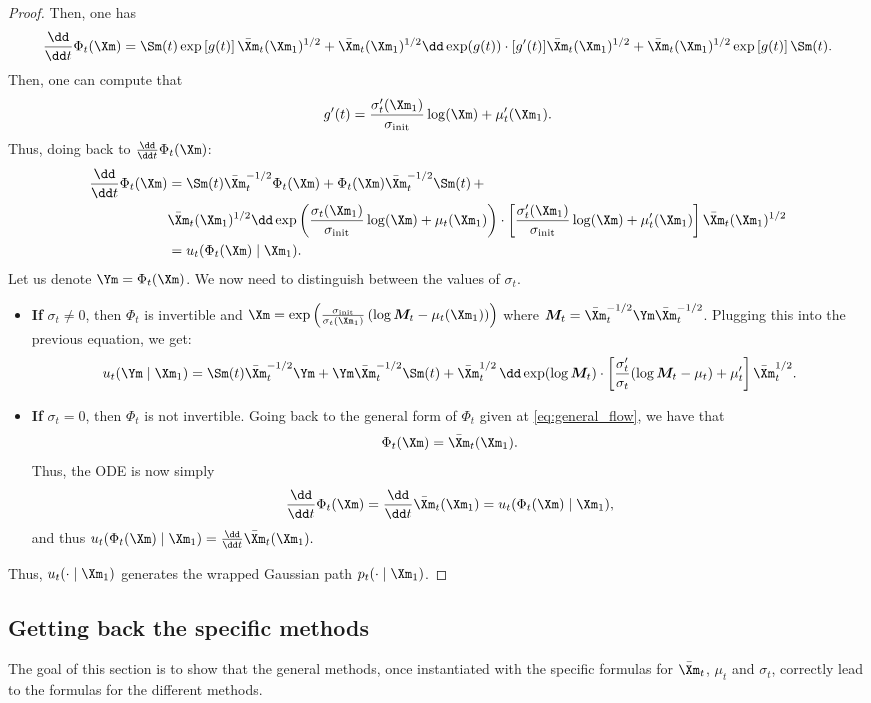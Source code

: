 \documentclass[10pt]{article} %
\theoremstyle{plain}
\theoremstyle{definition}
\theoremstyle{remark}
\begin{document}
\begin{proof}
  Then, one has
  \begin{equation*}
    \frac{\dd}{\dd t} \Phi_t(\Xm) = \Sm(t)\exp\left[g(t)\right]\bar{\Xm}_t(\Xm_1)^{1/2} + \bar{\Xm}_t(\Xm_1)^{1/2}\dd \exp(g(t))\cdot[g'(t)]\bar{\Xm}_t(\Xm_1)^{1/2} +  \bar{\Xm}_t(\Xm_1)^{1/2}\exp\left[g(t)\right]\Sm(t).
  \end{equation*}
  Then, one can compute that
  $$g'(t) = \frac{\sigma'_t(\Xm_1)}{\sigma_{\text{init}}}\log(\Xm) + \mu'_t(\Xm_1).$$
  Thus, doing back to $\frac{\dd}{\dd t} \Phi_t(\Xm)$:
  \begin{align*}
    \frac{\dd}{\dd t} \Phi_t(\Xm) &= \Sm(t)\bar{\Xm}_t^{-1/2} \Phi_t(\Xm) + \Phi_t(\Xm)\bar{\Xm}_t^{-1/2}\Sm(t) \,+\\
    & \bar{\Xm}_t(\Xm_1)^{1/2}\dd \exp\left(\frac{\sigma_t(\Xm_1)}{\sigma_{\text{init}}}\log(\Xm) + \mu_t(\Xm_1)\right)\cdot\left[\frac{\sigma'_t(\Xm_1)}{\sigma_{\text{init}}}\log(\Xm) + \mu'_t(\Xm_1)\right]\bar{\Xm}_t(\Xm_1)^{1/2} \\
    &= u_t(\Phi_t(\Xm) \mid \Xm_1).
  \end{align*}
  Let us denote $\Ym = \Phi_t(\Xm)$. We now need to distinguish between the values of $\sigma_t$.
  \begin{itemize}
    \item \textbf{If} $\sigma_t \neq 0$, then $\Phi_t$ is invertible and $\Xm = \exp\left(\frac{\sigma_{\text{init}}}{\sigma_t(\Xm_1)}\left(\log\bm M_t - \mu_t(\Xm_1)\right)\right)$ where $\bm M_t=\bar{\Xm}_t^{-1/2}\Ym\bar{\Xm}_t^{-1/2}$. Plugging this into the previous equation, we get:
      $$u_t(\Ym \mid \Xm_1) = \Sm(t)\bar{\Xm}_t^{-1/2}\Ym+ \Ym\bar{\Xm}_t^{-1/2}\Sm(t)+ \bar{\Xm}_t^{1/2}\,\dd\exp(\log \bm M_t)\cdot\left[\frac{\sigma_t'}{\sigma_t}(\log \bm M_t-\mu_t)+ \mu_t'\right]\bar{\Xm}_t^{1/2}.$$
    \item \textbf{If} $\sigma_t = 0$, then $\Phi_t$ is not invertible. Going back to the general form of $\Phi_t$ given at \cref{eq:general_flow}, we have that
      $$\Phi_t(\Xm)= \bar{\Xm}_t(\Xm_1).$$
      Thus, the ODE is now simply $$\frac{\dd}{\dd t} \Phi_t(\Xm) = \frac{\dd}{\dd t}\bar{\Xm}_t(\Xm_1) = u_t(\Phi_t(\Xm) \mid \Xm_1),$$
      and thus $u_t(\Phi_t(\Xm) \mid \Xm_1) = \frac{\dd}{\dd t}\bar{\Xm}_t(\Xm_1).$
  \end{itemize}
  Thus, $u_t(\cdot \mid \Xm_1)$ generates the wrapped Gaussian path $p_t(\cdot \mid \Xm_1)$.
\end{proof}

\subsection{Getting back the specific methods}
\label{appendix:getting_back_to_the_methods}
The goal of this section is to show that the general methods, once instantiated with the specific formulas for $\bar{\Xm}_t$, $\mu_t$ and $\sigma_t$, correctly lead to the formulas for the different methods.
\end{document}
